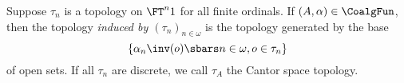 \documentclass{entcs}
\begin{document}
%
%
%
%
\begin{defn}
  Suppose $\tau_n$ is a topology on $\FT^n 1$ for all finite ordinals.
  If $(A, \alpha) \in \CoalgFun$, then the topology \emph{induced by
    $(\tau_n)_{n \in \omega}$} is the topology generated by the base
\[
  \lbrace \alpha_n\inv(o) \sbars n \in \omega, o \in \tau_n \rbrace
\]
of open sets. If all $\tau_n$ are discrete, we call $\tau_A$ the
Cantor space topology.
\end{defn}
\end{document}
